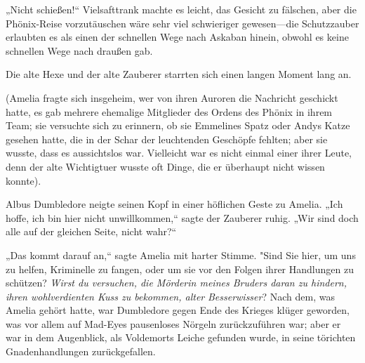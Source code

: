 „Nicht schießen!“ Vielsafttrank machte es leicht, das Gesicht zu fälschen, aber die Phönix-Reise vorzutäuschen wäre sehr viel schwieriger gewesen—die Schutzzauber erlaubten es als einen der schnellen Wege nach Askaban hinein, obwohl es keine schnellen Wege nach draußen gab.

Die alte Hexe und der alte Zauberer starrten sich einen langen Moment lang an.

(Amelia fragte sich insgeheim, wer von ihren Auroren die Nachricht geschickt hatte, es gab mehrere ehemalige Mitglieder des Ordens des Phönix in ihrem Team; sie versuchte sich zu erinnern, ob sie Emmelines Spatz oder Andys Katze gesehen hatte, die in der Schar der leuchtenden Geschöpfe fehlten; aber sie wusste, dass es aussichtslos war. Vielleicht war es nicht einmal einer ihrer Leute, denn der alte Wichtigtuer wusste oft Dinge, die er überhaupt nicht wissen konnte).

Albus Dumbledore neigte seinen Kopf in einer höflichen Geste zu Amelia. „Ich hoffe, ich bin hier nicht unwillkommen,“ sagte der Zauberer ruhig. „Wir sind doch alle auf der gleichen Seite, nicht wahr?“

„Das kommt darauf an,“ sagte Amelia mit harter Stimme. "Sind Sie hier, um uns zu helfen, Kriminelle zu fangen, oder um sie vor den Folgen ihrer Handlungen zu schützen? \emph{Wirst du versuchen, die Mörderin meines Bruders daran zu hindern, ihren wohlverdienten Kuss zu bekommen, alter} \emph{Besserwisser}? Nach dem, was Amelia gehört hatte, war Dumbledore gegen Ende des Krieges klüger geworden, was vor allem auf Mad-Eyes pausenloses Nörgeln zurückzuführen war; aber er war in dem Augenblick, als Voldemorts Leiche gefunden wurde, in seine törichten Gnadenhandlungen zurückgefallen.

